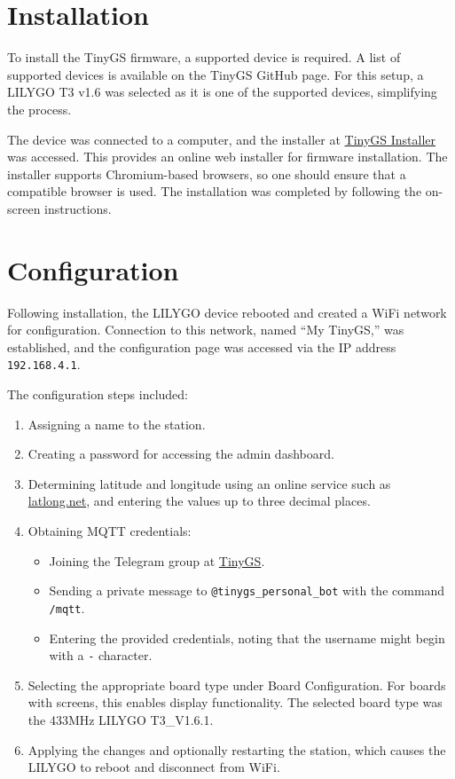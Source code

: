 \documentclass[12pt,a4paper]{article}
\begin{document}
\section{Installation}
To install the TinyGS firmware, a supported device is required. A list of supported devices is available on the TinyGS GitHub page. For this setup, a LILYGO T3 v1.6 was selected as it is one of the supported devices, simplifying the process.

The device was connected to a computer, and the installer at \href{http://installer.tinygs.com}{TinyGS Installer} was accessed. This provides an online web installer for firmware installation. The installer supports Chromium-based browsers, so one should ensure that a compatible browser is used. The installation was completed by following the on-screen instructions.

\section{Configuration}
Following installation, the LILYGO device rebooted and created a WiFi network for configuration. Connection to this network, named ``My TinyGS,'' was established, and the configuration page was accessed via the IP address \texttt{192.168.4.1}.

The configuration steps included:
\begin{enumerate}
    \item Assigning a name to the station.
    \item Creating a password for accessing the admin dashboard.
    \item Determining latitude and longitude using an online service such as \href{http://latlong.net}{latlong.net}, and entering the values up to three decimal places.
    \item Obtaining MQTT credentials:
    \begin{itemize}
        \item Joining the Telegram group at \href{https://tinygs.com}{TinyGS}.
        \item Sending a private message to \texttt{@tinygs\_personal\_bot} with the command \texttt{/mqtt}.
        \item Entering the provided credentials, noting that the username might begin with a \texttt{-} character.
    \end{itemize}
    \item Selecting the appropriate board type under Board Configuration. For boards with screens, this enables display functionality. The selected board type was the 433MHz LILYGO T3\_V1.6.1.
    \item Applying the changes and optionally restarting the station, which causes the LILYGO to reboot and disconnect from WiFi.
\end{enumerate}
\end{document}
